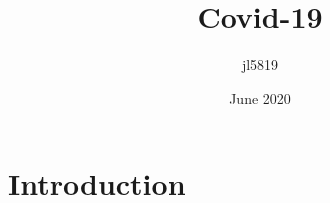 \documentclass{article}
\title{Covid-19}
\author{jl5819 }
\date{June 2020}
\begin{document}
\maketitle

\section{Introduction}
\end{document}
